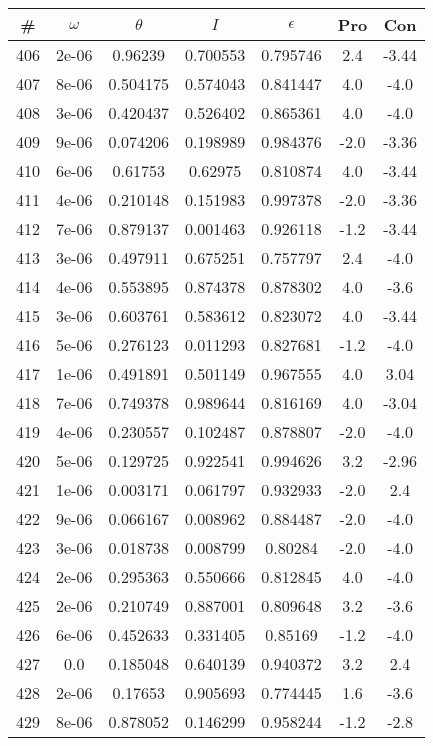\begin{table}
\begin{tabular}{c|c|c|c|c|c|c}
\# & $\omega$ & $\theta$ & $I$ & $\epsilon$ & Pro & Con\\
\hline
406 & 2e-06 & 0.96239 & 0.700553 & 0.795746 & 2.4 & -3.44\\
407 & 8e-06 & 0.504175 & 0.574043 & 0.841447 & 4.0 & -4.0\\
408 & 3e-06 & 0.420437 & 0.526402 & 0.865361 & 4.0 & -4.0\\
409 & 9e-06 & 0.074206 & 0.198989 & 0.984376 & -2.0 & -3.36\\
410 & 6e-06 & 0.61753 & 0.62975 & 0.810874 & 4.0 & -3.44\\
411 & 4e-06 & 0.210148 & 0.151983 & 0.997378 & -2.0 & -3.36\\
412 & 7e-06 & 0.879137 & 0.001463 & 0.926118 & -1.2 & -3.44\\
413 & 3e-06 & 0.497911 & 0.675251 & 0.757797 & 2.4 & -4.0\\
414 & 4e-06 & 0.553895 & 0.874378 & 0.878302 & 4.0 & -3.6\\
415 & 3e-06 & 0.603761 & 0.583612 & 0.823072 & 4.0 & -3.44\\
416 & 5e-06 & 0.276123 & 0.011293 & 0.827681 & -1.2 & -4.0\\
417 & 1e-06 & 0.491891 & 0.501149 & 0.967555 & 4.0 & 3.04\\
418 & 7e-06 & 0.749378 & 0.989644 & 0.816169 & 4.0 & -3.04\\
419 & 4e-06 & 0.230557 & 0.102487 & 0.878807 & -2.0 & -4.0\\
420 & 5e-06 & 0.129725 & 0.922541 & 0.994626 & 3.2 & -2.96\\
421 & 1e-06 & 0.003171 & 0.061797 & 0.932933 & -2.0 & 2.4\\
422 & 9e-06 & 0.066167 & 0.008962 & 0.884487 & -2.0 & -4.0\\
423 & 3e-06 & 0.018738 & 0.008799 & 0.80284 & -2.0 & -4.0\\
424 & 2e-06 & 0.295363 & 0.550666 & 0.812845 & 4.0 & -4.0\\
425 & 2e-06 & 0.210749 & 0.887001 & 0.809648 & 3.2 & -3.6\\
426 & 6e-06 & 0.452633 & 0.331405 & 0.85169 & -1.2 & -4.0\\
427 & 0.0 & 0.185048 & 0.640139 & 0.940372 & 3.2 & 2.4\\
428 & 2e-06 & 0.17653 & 0.905693 & 0.774445 & 1.6 & -3.6\\
429 & 8e-06 & 0.878052 & 0.146299 & 0.958244 & -1.2 & -2.8\\

\end{tabular}
\end{table}
